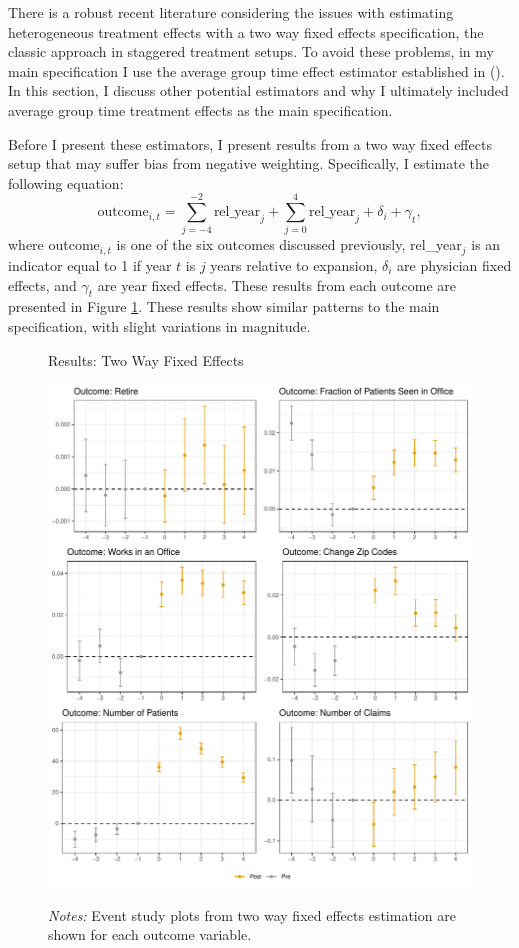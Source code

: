 \documentclass[12pt]{article}
\begin{document}
There is a robust recent literature considering the issues with estimating heterogeneous treatment effects with a two way fixed effects specification, the classic approach in staggered treatment setups. To avoid these problems, in my main specification I use the average group time effect estimator established in \citeauthor{callaway2021difference} (\citeyear{callaway2021difference}). In this section, I discuss other potential estimators and why I ultimately included average group time treatment effects as the main specification. 

Before I present these estimators, I present results from a two way fixed effects setup that may suffer bias from negative weighting. Specifically, I estimate the following equation:
$$\text{outcome}_{i,t}=\sum_{j=-4}^{-2} \text{rel\_year}_{j} + \sum_{j=0}^{4} \text{rel\_year}_{j} + \delta_i + \gamma_t,$$
where outcome$_{i,t}$ is one of the six outcomes discussed previously, rel\_year$_j$ is an indicator equal to 1 if year $t$ is $j$ years relative to expansion, $\delta_i$ are physician fixed effects, and $\gamma_t$ are year fixed effects.
These results from each outcome are presented in Figure \ref{fig:twfe}. These results show similar patterns to the main specification, with slight variations in magnitude. 

\begin{figure}
    \centering
    \captionsetup{width=.8\linewidth}
    \caption{Results: Two Way Fixed Effects}
    \includegraphics[scale=.8]{Objects/twfe_plot.pdf}
    \label{fig:twfe}
    \vspace{2mm}
    \caption*{\footnotesize{\textit{Notes:} Event study plots from two way fixed effects estimation are shown for each outcome variable.}}
\end{figure}
\end{document}
